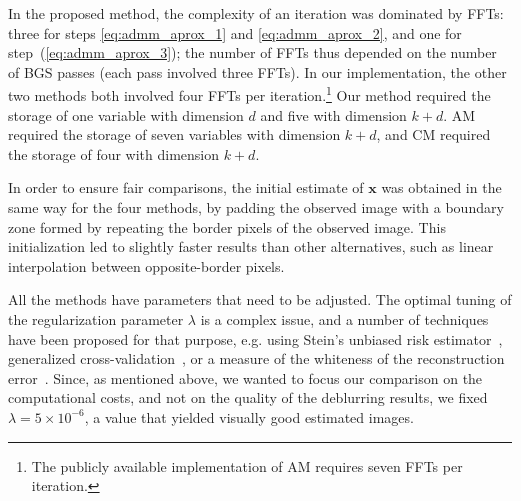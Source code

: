 \documentclass[10pt,twocolumn,twoside]{IEEEtran}
\newcommand{\x}{\mathbf{x}} %
\begin{document}
In the proposed method, the complexity of an iteration was dominated by FFTs: three for steps \eqref{eq:admm_aprox_1} and \eqref{eq:admm_aprox_2}, and one for step~(\ref{eq:admm_aprox_3}); the number of FFTs thus depended on the number of BGS passes (each pass involved three FFTs). In our implementation, the other two methods both involved four FFTs per iteration.\footnote{The publicly available implementation of AM requires seven FFTs per iteration.} Our method required the storage of one variable with dimension $d$ and five with dimension ${k+d}$. AM required the storage of seven variables with dimension ${k+d}$, and CM required the storage of four with dimension ${k+d}$.

In order to ensure fair comparisons, the initial estimate of $\x$ was obtained in the same way for the four methods, by padding the observed image with a boundary zone formed by repeating the border pixels of the observed image. This initialization led to slightly faster results than other alternatives, such as linear interpolation between opposite-border pixels.

All the methods have parameters that need to be adjusted. The optimal tuning of the regularization parameter $\lambda$ is a complex issue, and a number of techniques have been proposed for that purpose, e.g. using Stein's unbiased risk estimator~\cite{Donoho1995}, generalized cross-validation~\cite{Golub1979}, or a measure of the whiteness of the reconstruction error~\cite{Almeida2013}. Since, as mentioned above, we wanted to focus our comparison on the computational costs, and not on the quality of the deblurring results, we fixed $\lambda = 5 \times 10^{-6}$, a value that yielded visually good estimated images.
\end{document}
